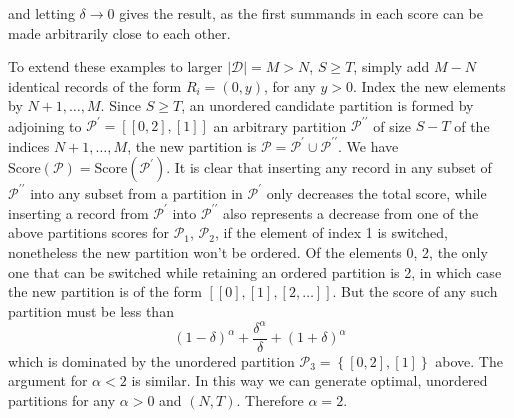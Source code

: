 \documentclass{article}
\theoremstyle{case}
\begin{document}
and letting $\delta \rightarrow 0$ gives the result, as the first summands in each score can be made arbitrarily close to each other.

To extend these examples to larger $\vert \mathcal{D} \vert = M > N$, $S \geq T$, simply add $M-N$ identical records of the form $R_i = \left( 0, y\right)$, for any $y > 0$. Index the new elements by $N+1, \dots, M$. Since $S \geq T$, an unordered candidate partition is formed by adjoining to $\mathcal{P}^{\prime} = \left[\left[0, 2\right], \left[ 1\right]\right]$ an arbitrary partition $\mathcal{P}^{\prime\prime}$ of size $S - T$ of the indices $N+1, \dots, M$, the new partition is $\mathcal{P} = \mathcal{P}^{\prime} \cup \mathcal{P}^{\prime\prime}$. We have $\text{Score}\left(\mathcal{P}\right) = \text{Score}\left(\mathcal{P}^{\prime}\right)$. It is clear that inserting any record in any subset of $\mathcal{P}^{\prime\prime}$ into any subset from a partition in $\mathcal{P}^{\prime}$ only decreases the total score, while inserting a record from $\mathcal{P}^{\prime}$ into $\mathcal{P}^{\prime\prime}$ also represents a decrease from one of the above partitions scores for $\mathcal{P}_1$, $\mathcal{P}_2$, if the element of index 1 is switched, nonetheless the new partition won't be ordered. Of the elements 0, 2, the only one that can be switched while retaining an ordered partition is 2, in which case the new partition is of the form $\left[ \left[ 0\right], \left[ 1\right], \left[ 2, \dots\right]\right]$. But the score of any such partition must be less than
\[
\left( 1-\delta\right)^\alpha + \frac{\delta^\alpha}{\delta} + \left( 1+\delta\right)^\alpha
\]
which is dominated by the unordered partition $\mathcal{P}_3 = \left\lbrace \left[ 0, 2 \right], \left[ 1 \right]\right\rbrace$ above. The argument for $\alpha < 2$ is similar. In this way we can generate optimal, unordered partitions for any $\alpha > 0$ and $\left( N, T\right)$. Therefore $\alpha = 2$.
\end{document}
